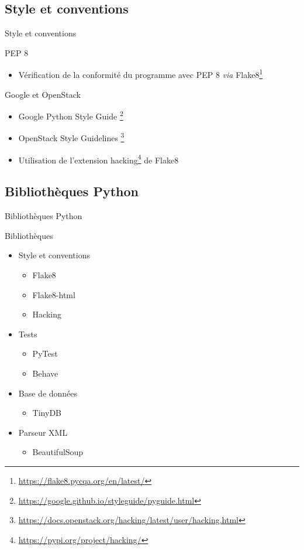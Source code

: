 \subsection{Style et conventions}
\begin{frame}{Style et conventions}
  \begin{block}{PEP 8}
    \begin{itemize}
    \item Vérification de la conformité du programme avec PEP 8
      \textit{via}
      Flake8\footnote{\url{https://flake8.pycqa.org/en/latest/}}
    \end{itemize}
  \end{block}
  
  \begin{block}{Google et OpenStack}
    \begin{itemize}
    \item Google Python Style Guide \footnote{\url{https://google.github.io/styleguide/pyguide.html}}
    \item OpenStack Style
      Guidelines \footnote{\url{https://docs.openstack.org/hacking/latest/user/hacking.html}}
    \item Utilisation de l'extension
      hacking\footnote{\url{https://pypi.org/project/hacking/}} de
      Flake8
    \end{itemize}
  \end{block}
\end{frame}

\subsection{Bibliothèques Python}
\begin{frame}{Bibliothèques Python}
  \begin{block}{Bibliothèques}
    \begin{itemize}
    \item Style et conventions
      \begin{itemize}
      \item Flake8
      \item Flake8-html
      \item Hacking      
      \end{itemize}

    \item Tests
      \begin{itemize}
      \item PyTest
      \item Behave
      \end{itemize}

    \item Base de données
      \begin{itemize}
      \item TinyDB
      \end{itemize}

    \item Parseur XML
      \begin{itemize}
      \item BeautifulSoup
      \end{itemize}
    \end{itemize}
  \end{block}
\end{frame}
